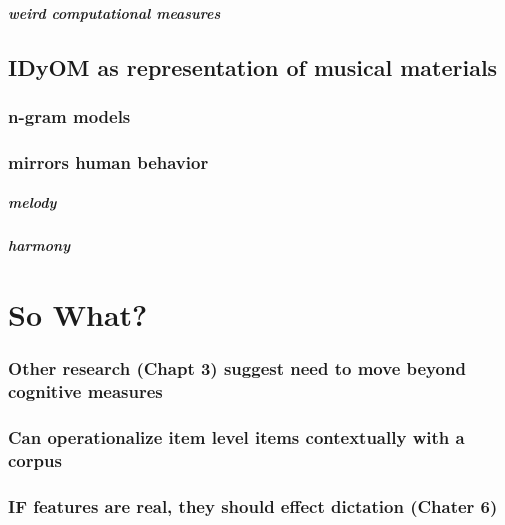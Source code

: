 \documentclass[]{book}
\let\oldsubparagraph\subparagraph
\renewcommand{\subparagraph}[1]{\oldsubparagraph{#1}\mbox{}}
\theoremstyle{definition}
\theoremstyle{definition}
\theoremstyle{definition}
\theoremstyle{remark}
\begin{document}
\hypertarget{weird-computational-measures}{%
\subparagraph{weird computational
measures}\label{weird-computational-measures}}

\hypertarget{idyom-as-representation-of-musical-materials}{%
\subsection{IDyOM as representation of musical
materials}\label{idyom-as-representation-of-musical-materials}}

\hypertarget{n-gram-models}{%
\subsubsection{n-gram models}\label{n-gram-models}}

\hypertarget{mirrors-human-behavior}{%
\subsubsection{mirrors human behavior}\label{mirrors-human-behavior}}

\hypertarget{melody}{%
\subparagraph{melody}\label{melody}}

\hypertarget{harmony}{%
\subparagraph{harmony}\label{harmony}}

\hypertarget{so-what}{%
\section{So What?}\label{so-what}}

\hypertarget{other-research-chapt-3-suggest-need-to-move-beyond-cognitive-measures}{%
\subsubsection{Other research (Chapt 3) suggest need to move beyond
cognitive
measures}\label{other-research-chapt-3-suggest-need-to-move-beyond-cognitive-measures}}

\hypertarget{can-operationalize-item-level-items-contextually-with-a-corpus}{%
\subsubsection{Can operationalize item level items contextually with a
corpus}\label{can-operationalize-item-level-items-contextually-with-a-corpus}}

\hypertarget{if-features-are-real-they-should-effect-dictation-chater-6}{%
\subsubsection{IF features are real, they should effect dictation
(Chater
6)}\label{if-features-are-real-they-should-effect-dictation-chater-6}}
\end{document}
